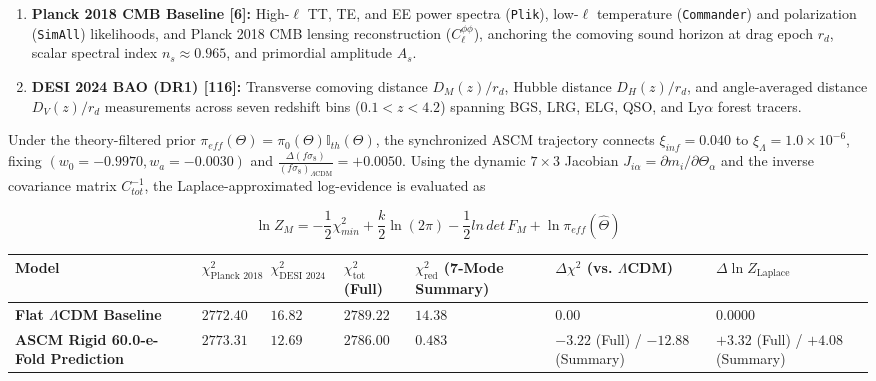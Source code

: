 \documentclass[aps,prd,onecolumn,superscriptaddress,nofootinbib,longbibliography,10pt]{revtex4-2}
\begin{document}
  
\begin{enumerate}
    
\item \textbf{Planck 2018 CMB Baseline [6]:} High-\(\ell\) TT, TE, and EE power spectra (\texttt{Plik}), low-\(\ell\) temperature (\texttt{Commander}) and polarization (\texttt{SimAll}) likelihoods, and Planck 2018 CMB lensing reconstruction (\(C_\ell^{\phi\phi}\)), anchoring the comoving sound horizon at drag epoch \(r_d\), scalar spectral index \(n_s \approx 0.965\), and primordial amplitude \(A_s\).
    
\item \textbf{DESI 2024 BAO (DR1) [116]:} Transverse comoving distance \(D_M(z)/r_d\), Hubble distance \(D_H(z)/r_d\), and angle-averaged distance \(D_V(z)/r_d\) measurements across seven redshift bins (\(0.1 < z < 4.2\)) spanning BGS, LRG, ELG, QSO, and Ly\(\alpha\) forest tracers.
  
\end{enumerate}

  Under the theory-filtered prior \(\pi_{eff}(\Theta) = \pi_0(\Theta)\mathbb{I}_{th}(\Theta)\), the synchronized ASCM trajectory connects \(\xi_{inf} = 0.040\) to \(\xi_{\Lambda} = 1.0 \times 10^{-6}\), fixing \((w_0 = -0.9970, w_a = -0.0030)\) and \(\displaystyle\frac{\Delta(f\sigma_{8})}{(f\sigma_{8})_{\Lambda\mathrm{CDM}}} = +0.0050\). Using the dynamic \(7 \times 3\) Jacobian \(J_{i\alpha} = \partial m_i/\partial\Theta_\alpha\) and the inverse covariance matrix \(C_{tot}^{-1}\), the Laplace-approximated log-evidence is evaluated as


  \[ \ln Z_M = -\frac{1}{2}\chi_{min}^2 + \frac{k}{2}\ln(2\pi) - \frac{1}{2}\mathit{ln}\,\mathit{det}\,F_M + \ln\pi_{eff}(\hat{\Theta}) \]
  
\begin{center}
\begin{tabular}{|lllllll|}
\hline

      Model & \(\chi^2_{\text{Planck 2018}}\) & \(\chi^2_{\text{DESI 2024 BAO}}\) & \(\chi^2_{\text{tot}}\) (Full) & \(\chi^2_{\text{red}}\) (7-Mode Summary) & \(\Delta\chi^2\) (vs. $\Lambda$CDM) & \(\Delta\ln Z_{\text{Laplace}}\)
       \\ \hline

    
    
      \textbf{Flat $\Lambda$CDM Baseline} & \(2772.40\) & \(16.82\) & \(2789.22\) & \(14.38\) & \(0.00\) & \(0.0000\) \\ \hline

      \textbf{ASCM Rigid 60.0-e-Fold Prediction} & \(2773.31\) & \(12.69\) & \(2786.00\) & \(0.483\) & \(-3.22\) (Full) / \(-12.88\) (Summary) & \(+3.32\) (Full) / \(+4.08\) (Summary) \\ \hline

    
  \end{tabular}
\end{center}
\end{document}
